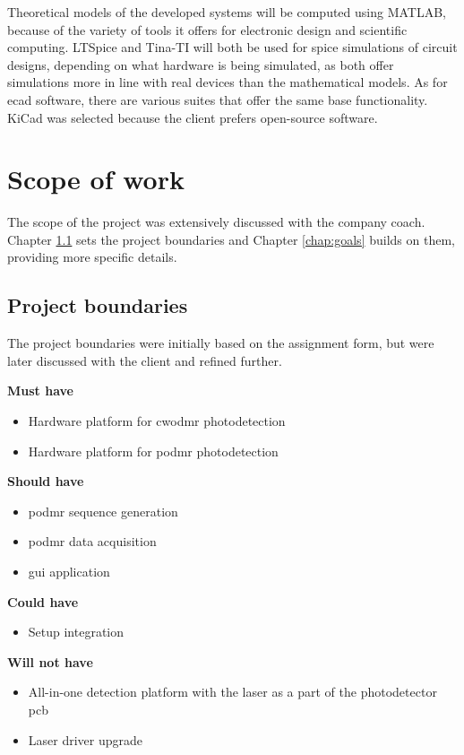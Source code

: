 Theoretical models of the developed systems will be computed using MATLAB, because of the variety of tools it offers for electronic design and scientific computing. LTSpice and Tina-TI will both be used for \gls{spice} simulations of circuit designs, depending on what hardware is being simulated, as both offer simulations more in line with real devices than the mathematical models. As for \gls{ecad} software, there are various suites that offer the same base functionality. KiCad was selected because the client prefers open-source software.  



\section{Scope of work}
The scope of the project was extensively discussed with the company coach. Chapter \ref{chap:project_boundaries} sets the project boundaries and Chapter \ref{chap:goals} builds on them, providing more specific details.

\subsection{Project boundaries}\label{chap:project_boundaries}
The project boundaries were initially based on the assignment form, but were later discussed with the client and refined further. 

\textbf{Must have}
\begin{itemize}
	\item Hardware platform for \gls{cwodmr} photodetection
	\item Hardware platform for \gls{podmr} photodetection
\end{itemize}

\textbf{Should have}
\begin{itemize}
	\item \gls{podmr} sequence generation
	\item \gls{podmr} data acquisition
	\item \gls{gui} application
\end{itemize}

\textbf{Could have}
\begin{itemize}
	\item Setup integration
\end{itemize}

\textbf{Will not have}
\begin{itemize}
	\item All-in-one detection platform with the laser as a part of the photodetector \gls{pcb}
	\item Laser driver upgrade
\end{itemize}


